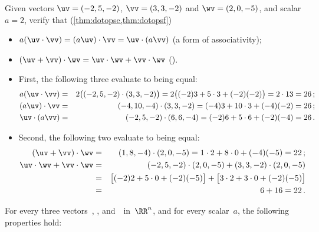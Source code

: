 \begin{example} 
Given vectors \(\uv=(-2,5,-2)\), \(\vv=(3,3,-2)\) and \(\wv=(2,0,-5)\), and  scalar \(a=2\), verify that (\cref{thm:dotopse,thm:dotopsf})
\begin{itemize}
\item \(a(\uv\cdot\vv)=(a\uv)\cdot\vv=\uv\cdot(a\vv)\) (a form of associativity);
\item \((\uv+\vv)\cdot\wv=\uv\cdot\wv+\vv\cdot\wv\) ().
\end{itemize}
\begin{solution} 
\begin{itemize}
\item First, the following three evaluate to being equal:
\begin{eqnarray*}
a(\uv\cdot\vv)&=&2\big((-2,5,-2)\cdot(3,3,-2)\big)
=2\big((-2)3+5\cdot3+(-2)(-2)\big)
=2\cdot13=26\,;
\\(a\uv)\cdot\vv&=&(-4,10,-4)\cdot(3,3,-2)
=(-4)3+10\cdot3+(-4)(-2)
=26\,;
\\\uv\cdot(a\vv)&=&(-2,5,-2)\cdot(6,6,-4)
=(-2)6+5\cdot6+(-2)(-4)
=26\,.
\end{eqnarray*}

\item Second, the following two evaluate to being equal:
\begin{eqnarray*}
(\uv+\vv)\cdot\wv&=&(1,8,-4)\cdot(2,0,-5)
=1\cdot2+8\cdot0+(-4)(-5)
=22\,;
\\\uv\cdot\wv+\vv\cdot\wv&=&
(-2,5,-2)\cdot(2,0,-5)
+(3,3,-2)\cdot(2,0,-5)
\\&=&\big[(-2)2+5\cdot0+(-2)(-5)\big]
+\big[3\cdot2+3\cdot0+(-2)(-5)\big]
\\&=&6+16=22\,.
\end{eqnarray*}
\end{itemize}
\end{solution}
\end{example}




\begin{theorem} \label{thm:dotops}
For every three vectors~\uv, \vv, and~\wv\ in~\(\RR^n\), and for every scalar~\(a\), the following properties hold:
\end{theorem}


